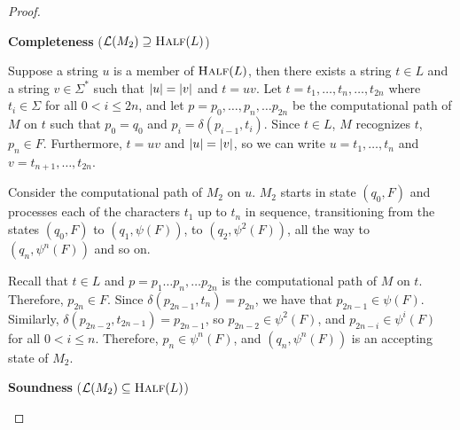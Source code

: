 \begin{problem}
\begin{Answer}
\begin{claim}
\begin{proof}
        \step
        \begin{enumroman}
          \item \textbf{Completeness} ($\mathcal{L}(M_2) \supseteq \textsc{Half}(L)$)
          
          \step
          Suppose a string $u$ is a member of $\textsc{Half}(L)$, then
          there exists a string $t \in L$ and a string $v \in \Sigma^*$
          such that $\lvert u\rvert = \lvert v\rvert$ and $t = uv$.
          Let $t = t_1, \ldots, t_n, \ldots, t_{2n}$ where $t_i \in \Sigma$ for all $0 < i \le 2n$, and
          let $p = p_0, \ldots, p_n, \ldots p_{2n}$ be the computational path of $M$ on $t$
          such that $p_0 = q_0$ and $p_i = \delta(p_{i-1}, t_i)$.
          Since $t \in L$, $M$ recognizes $t$, $p_n \in F$.
          Furthermore, $t = uv$ and $\lvert u\rvert = \lvert v\rvert$, so we can write
          $u = t_1, \ldots, t_n$ and $v = t_{n+1}, \ldots, t_{2n}$.
          
          \step
          Consider the computational path of $M_2$ on $u$.
          $M_2$ starts in state $(q_0, F)$ and processes each of the characters
          $t_1$ up to $t_n$ in sequence, transitioning from the states
          $(q_0, F)$ to $(q_1, \psi(F))$, to $(q_2, \psi^2(F))$, all the way to $(q_n, \psi^n(F))$ and so on.

          \step
          Recall that $t \in L$ and $p = p_1 \ldots p_n, \ldots p_{2n}$ is the computational
          path of $M$ on $t$.
          Therefore, $p_{2n} \in F$.
          Since $\delta(p_{2n-1}, t_n) = p_{2n}$, we have that
          $p_{2n-1} \in \psi(F)$. Similarly, $\delta(p_{2n-2}, t_{2n-1}) = p_{2n-1}$,
          so $p_{2n-2} \in \psi^2(F)$,
          and $p_{2n-i} \in \psi^i(F)$ for all $0 < i \le n$.
          Therefore, $p_n \in \psi^n(F)$, and $(q_n, \psi^n(F))$ is an accepting state of $M_2$.

          \item \textbf{Soundness} ($\mathcal{L}(M_2) \subseteq \textsc{Half}(L)$)
            

\end{enumroman}
\end{proof}
\end{claim}
\end{Answer}
\end{problem}
